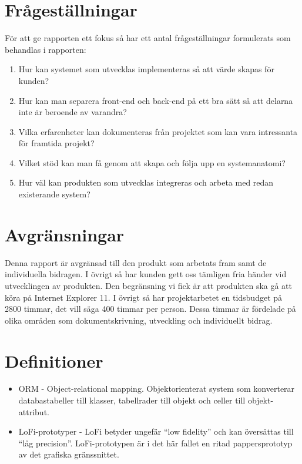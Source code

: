 \section{Frågeställningar}
För att ge rapporten ett fokus så har ett antal frågeställningar formulerats som behandlas i rapporten:
\begin{enumerate}
	\item Hur kan systemet som utvecklas implementeras så att värde skapas för kunden?
	\item Hur kan man separera front-end och back-end på ett bra sätt så att delarna inte är beroende av varandra?
	\item Vilka erfarenheter kan dokumenteras från projektet som kan vara intressanta för framtida projekt?
	\item Vilket stöd kan man få genom att skapa och följa upp en systemanatomi?
	\item Hur väl kan produkten som utvecklas integreras och arbeta med redan existerande system? 
\end{enumerate}

\section{Avgränsningar}
Denna rapport är avgränsad till den produkt som arbetats fram samt de individuella bidragen. I övrigt så har kunden gett oss tämligen fria händer vid utvecklingen av produkten. Den begränsning vi fick är att produkten ska gå att köra på Internet Explorer 11.
I övrigt så har projektarbetet en tidsbudget på 2800 timmar, det vill säga 400 timmar per person. Dessa timmar är fördelade på olika områden som dokumentskrivning, utveckling och individuellt bidrag.

\section{Definitioner}

\begin{itemize}

\item ORM - Object-relational mapping. Objektorienterat system som konverterar databastabeller till klasser, tabellrader till objekt och celler till objekt-attribut.

\item LoFi-prototyper - LoFi betyder ungefär ``low fidelity'' och kan översättas till ``låg precision''. LoFi-prototypen är i det här fallet en ritad pappersprototyp av det grafiska gränssnittet.

\end{itemize}

\newpage
